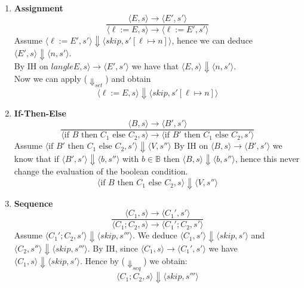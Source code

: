 \begin{solution}
\begin{enumerate}[label=(\alph*)]
\begin{enumerate}[label=(\alph{enumi}).\arabic*]
 Hence by ($\Downarrow_{op}$) \[\langle E_1 \; op\; E_2, s\rangle \Downarrow \langle n,s''\rangle\]
\item \textbf{Assignment}
   \[ \frac{\langle E,s\rangle \to \langle E', s'\rangle}{\langle \ell:=E,s\rangle \to \langle \ell:=E', s'\rangle}\]
   Assume $\langle \ell:=E', s'\rangle \Downarrow \langle skip, s'[\ell \mapsto n]\rangle$, hence we can deduce $\langle E', s\rangle \Downarrow \langle n, s'\rangle$. 
\\   By IH on $langle E,s\rangle \to \langle E', s'\rangle$ we have that $\langle E, s\rangle \Downarrow \langle n, s'\rangle$. 
   \\Now we can apply ($\Downarrow_{set}$) and obtain
   \[\langle \ell:=E,s\rangle \Downarrow \langle skip, s'[\ell \mapsto n]\rangle\]
\item \textbf{If-Then-Else}
         \[\frac{\langle B,s\rangle \to \langle B', s'\rangle}{\langle \text{if }B \text{ then }C_1 \text{ else }C_2, s\rangle \to \langle \text{if }B' \text{ then }C_1 \text{ else }C_2, s'\rangle}\]
         Assume $\langle \text{if }B' \text{ then }C_1 \text{ else }C_2, s'\rangle \Downarrow \langle V, s''\rangle $
         By IH on $\langle B,s\rangle \to \langle B', s'\rangle$ we know that if $\langle B', s'\rangle \Downarrow \langle b, s''\rangle$ with $b \in \mathbb{B} $ then $\langle B, s\rangle \Downarrow \langle b, s''\rangle$, hence this never change the evaluation of the boolean condition.
         \[\langle \text{if }B \text{ then }C_1 \text{ else }C_2, s\rangle \Downarrow \langle V, s''\rangle \]
\item \textbf{Sequence}
 \[ \frac{\langle C_1,s\rangle \to \langle C_1', s'\rangle}{\langle C_1;C_2,s\rangle \to \langle C_1';C_2, s'\rangle}\]
Assume $\langle C_1';C_2, s'\rangle \Downarrow \langle skip, s'''\rangle$. We deduce $\langle C_1, s'\rangle \Downarrow \langle skip, s'\rangle $ and $\langle C_2, s''\rangle \Downarrow \langle skip, s'''\rangle $.
By IH, since $\langle C_1,s\rangle \to \langle C_1', s'\rangle$ we have $\langle C_1,s\rangle \Downarrow \langle skip, s'\rangle$.
Hence by ($\Downarrow_{seq}$) we obtain: 
\[ \langle C_1;C_2, s\rangle \Downarrow \langle skip, s'''\rangle \]
\end{enumerate}



\end{enumerate}
\end{solution}